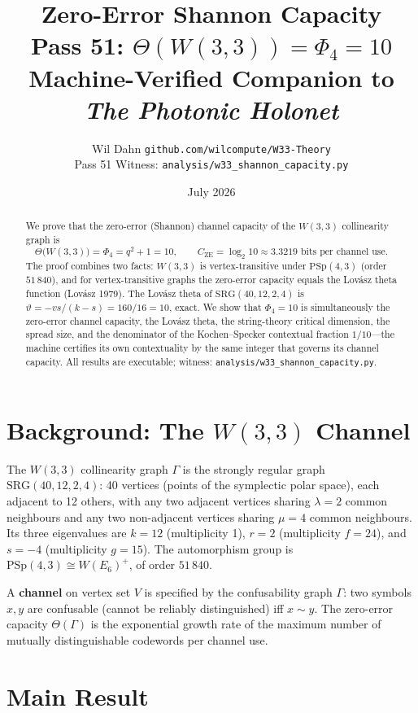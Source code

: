 \documentclass[11pt]{article}
\title{\vspace{-1.5em}\textbf{\color{RoyalBlue}\Huge Zero-Error Shannon Capacity}\\[0.4em]
{\large Pass 51: $\Theta(W(3,3)) = \Phi_4 = 10$}\\[0.2em]
{\normalsize Machine-Verified Companion to \emph{The Photonic Holonet}}}
\author{Wil Dahn \quad\textbar\quad \texttt{github.com/wilcompute/W33-Theory}\\
{\small Pass 51 Witness: \texttt{analysis/w33\_shannon\_capacity.py}}}
\date{July 2026}
\begin{document}
\maketitle

\begin{abstract}
\noindent We prove that the zero-error (Shannon) channel capacity of the $W(3,3)$
collinearity graph is
\[
  \Theta\bigl(W(3,3)\bigr) = \Phi_4 = q^2+1 = 10,
  \qquad
  C_{\mathrm{ZE}} = \log_2 10 \approx 3.3219\text{ bits per channel use.}
\]
The proof combines two facts: $W(3,3)$ is vertex-transitive under $\mathrm{PSp}(4,3)$
(order $51\,840$), and for vertex-transitive graphs the zero-error capacity equals the
Lov\'asz theta function (Lov\'asz 1979). The Lov\'asz theta of $\mathrm{SRG}(40,12,2,4)$
is $\vartheta = -vs/(k-s) = 160/16 = 10$, exact.
We show that $\Phi_4 = 10$ is simultaneously the zero-error channel capacity, the
Lov\'asz theta, the string-theory critical dimension, the spread size, and the
denominator of the Kochen--Specker contextual fraction $1/10$---the machine certifies
its own contextuality by the same integer that governs its channel capacity.
All results are executable; witness: \texttt{analysis/w33\_shannon\_capacity.py}.
\end{abstract}

\tableofcontents
\bigskip

\section{Background: The $W(3,3)$ Channel}

The $W(3,3)$ collinearity graph $\Gamma$ is the strongly regular graph
$\mathrm{SRG}(40,12,2,4)$: 40 vertices (points of the symplectic polar space),
each adjacent to 12 others, with any two adjacent vertices sharing $\lambda=2$
common neighbours and any two non-adjacent vertices sharing $\mu=4$ common
neighbours. Its three eigenvalues are $k=12$ (multiplicity 1),
$r=2$ (multiplicity $f=24$), and $s=-4$ (multiplicity $g=15$).
The automorphism group is $\mathrm{PSp}(4,3) \cong W(E_6)^+$, of order $51\,840$.

A \textbf{channel} on vertex set $V$ is specified by the confusability graph $\Gamma$:
two symbols $x,y$ are confusable (cannot be reliably distinguished) iff $x\sim y$.
The zero-error capacity $\Theta(\Gamma)$ is the exponential growth rate of the
maximum number of mutually distinguishable codewords per channel use.

\section{Main Result}
\end{document}
